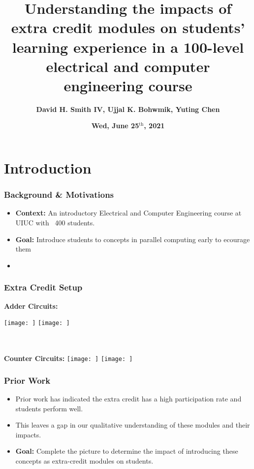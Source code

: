 \documentclass{beamer}
\title[Impacts of EC]{\textbf{Understanding the impacts of extra credit modules on students’ learning experience in a 100-level electrical and computer engineering course}}
\author[D.H Smith IV \textit{et al.}]{\textbf{David H. Smith IV, Ujjal K. Bohwmik, Yuting Chen}}
\institute[\textbf{UIUC}]{\textbf{University of Illinois Urbana-Champaign}}
\date{\textbf{Wed, June 25$^{\text{th}}$, 2021}}
\begin{document}
\frame{\titlepage}

\section{Introduction}

\begin{frame}
  \frametitle{Background \& Motivations}

  \begin{itemize}
    \item \textbf{Context:} An introductory Electrical and Computer Engineering course at UIUC with ~400 students.
    \item \textbf{Goal:} Introduce students to concepts in parallel computing early to ecourage them
    \item 
  \end{itemize}
\end{frame}

\begin{frame}
    \frametitle{Extra Credit Setup}

    \textbf{Adder Circuits:}

    \texttt{[image: ]}
    \texttt{[image: ]}

    \\ \midrule \\

    \textbf{Counter Circuits:}
    \texttt{[image: ]}
    \texttt{[image: ]}

    
\end{frame}

\begin{frame}
    \frametitle{Prior Work}

    \begin{itemize}
      \item Prior work has indicated the extra credit has a high participation rate and students perform well.
      \item This leaves a gap in our qualitative understanding of these modules and their impacts.
      \item \textbf{Goal:} Complete the picture to determine the impact of introducing these concepts as extra-credit modules on students.
    \end{itemize}
\end{frame}
\end{document}
